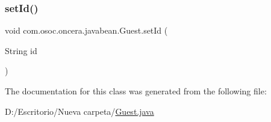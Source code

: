 \subsubsection{\texorpdfstring{setId()}{setId()}}
{\footnotesize\ttfamily void com.\+osoc.\+oncera.\+javabean.\+Guest.\+set\+Id (\begin{DoxyParamCaption}\item[{String}]{id }\end{DoxyParamCaption})}



The documentation for this class was generated from the following file\+:\begin{DoxyCompactItemize}
\item 
D\+:/\+Escritorio/\+Nueva carpeta/\mbox{\hyperlink{_guest_8java}{Guest.\+java}}\end{DoxyCompactItemize}
